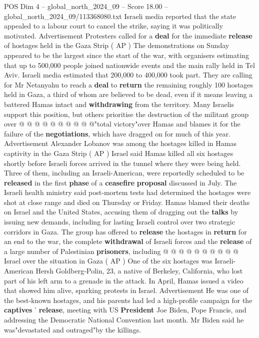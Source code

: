 \begin{textsample}{POS Dim 4 – global\_north\_2024\_09 – Score 18.00 – global\_north\_2024\_09/113368080.txt}
Israeli media reported that the state appealed to a labour court to cancel the strike, saying it was politically motivated.
Advertisement Protesters called for a \textbf{deal} for the immediate \textbf{release} of hostages held in the Gaza Strip ( AP ) The demonstrations on Sunday appeared to be the largest since the start of the war, with organisers estimating that up to 500,000 people joined nationwide events and the main rally held in Tel Aviv.
Israeli media estimated that 200,000 to 400,000 took part.
They are calling for Mr Netanyahu to reach a \textbf{deal} to \textbf{return} the remaining roughly 100 hostages held in Gaza, a third of whom are believed to be dead, even if it means leaving a battered Hamas intact and \textbf{withdrawing} from the territory.
Many Israelis support this position, but others prioritise the destruction of the militant group over @ @ @ @ @ @ @ @ @ @"total victory"over Hamas and blames it for the failure of the \textbf{negotiations}, which have dragged on for much of this year.
Advertisement Alexander Lobanov was among the hostages killed in Hamas captivity in the Gaza Strip ( AP ) Israel said Hamas killed all six hostages shortly before Israeli forces arrived in the tunnel where they were being held.
Three of them, including an Israeli-American, were reportedly scheduled to be \textbf{released} in the first \textbf{phase} of a \textbf{ceasefire} \textbf{proposal} discussed in July.
The Israeli health ministry said post-mortem tests had determined the hostages were shot at close range and died on Thursday or Friday.
Hamas blamed their deaths on Israel and the United States, accusing them of dragging out the \textbf{talks} by issuing new demands, including for lasting Israeli control over two strategic corridors in Gaza.
The group has offered to \textbf{release} the hostages in \textbf{return} for an end to the war, the complete \textbf{withdrawal} of Israeli forces and the \textbf{release} of a large number of Palestinian \textbf{prisoners}, including @ @ @ @ @ @ @ @ @ @ Israel over the situation in Gaza ( AP ) One of the six hostages was Israeli-American Hersh Goldberg-Polin, 23, a native of Berkeley, California, who lost part of his left arm to a grenade in the attack.
In April, Hamas issued a video that showed him alive, sparking protests in Israel.
Advertisement He was one of the best-known hostages, and his parents had led a high-profile campaign for the \textbf{captives} ' \textbf{release}, meeting with US \textbf{President} Joe Biden, Pope Francis, and addressing the Democratic National Convention last month.
Mr Biden said he was"devastated and outraged"by the killings.

\end{textsample}
